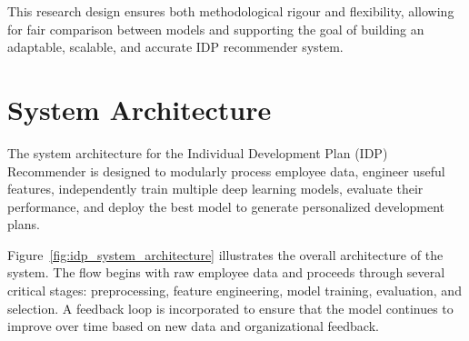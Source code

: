 This research design ensures both methodological rigour and flexibility, allowing for fair comparison between models and supporting the goal of building an adaptable, scalable, and accurate IDP recommender system.

\section{System Architecture}
\label{section:system_architecture}

The system architecture for the Individual Development Plan (IDP) Recommender is designed to modularly process employee data, engineer useful features, independently train multiple deep learning models, evaluate their performance, and deploy the best model to generate personalized development plans.

Figure~\ref{fig:idp_system_architecture} illustrates the overall architecture of the system. The flow begins with raw employee data and proceeds through several critical stages: preprocessing, feature engineering, model training, evaluation, and selection. A feedback loop is incorporated to ensure that the model continues to improve over time based on new data and organizational feedback.

